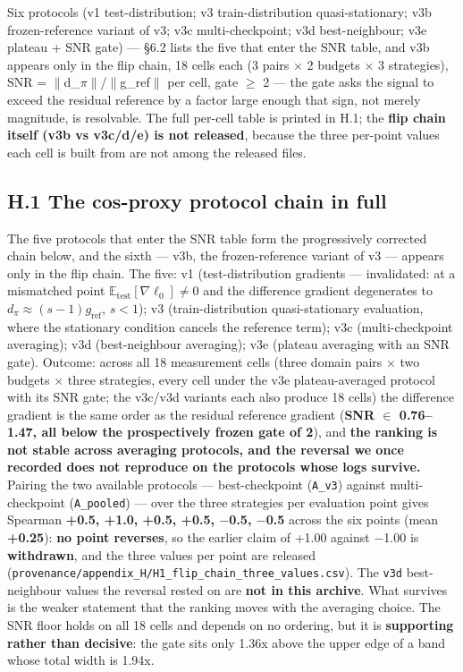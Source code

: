 \documentclass[pdflatex,sn-mathphys-ay]{sn-jnl}
\begin{document}
Six protocols (v1 test-distribution; v3 train-distribution quasi-stationary; v3b frozen-reference variant of v3; v3c multi-checkpoint; v3d best-neighbour; v3e plateau + SNR gate) --- \S{}6.2 lists the five that enter the SNR table, and v3b appears only in the flip chain, 18 cells each (3 pairs \ensuremath{\times} 2 budgets \ensuremath{\times} 3 strategies), SNR = \ensuremath{\|}d\_\ensuremath{\pi}\ensuremath{\|}/\ensuremath{\|}g\_ref\ensuremath{\|} per cell, gate \ensuremath{\geq} 2 --- the gate asks the signal to exceed the residual reference by a factor large enough that sign, not merely magnitude, is resolvable. The full per-cell table is printed in H.1; the \textbf{flip chain itself (v3b vs v3c/d/e) is not released}, because the three per-point values each cell is built from are not among the released files.

\subsection*{H.1 The cos-proxy protocol chain in full}

The five protocols that enter the SNR table form the progressively corrected chain below, and the sixth --- v3b, the frozen-reference variant of v3 --- appears only in the flip chain. The five: v1 (test-distribution gradients --- invalidated: at a mismatched point $\mathbb{E}_{\text{test}}[\nabla\ell_0]\neq0$ and the difference gradient degenerates to $d_\pi \approx (s{-}1)g_{\mathrm{ref}}$, $s<1$); v3 (train-distribution quasi-stationary evaluation, where the stationary condition cancels the reference term); v3c (multi-checkpoint averaging); v3d (best-neighbour averaging); v3e (plateau averaging with an SNR gate). Outcome: across all 18 measurement cells (three domain pairs \ensuremath{\times} two budgets \ensuremath{\times} three strategies, every cell under the v3e plateau-averaged protocol with its SNR gate; the v3c/v3d variants each also produce 18 cells) the difference gradient is the same order as the residual reference gradient (\textbf{SNR \ensuremath{\in} 0.76--1.47, all below the prospectively frozen gate of 2}), and \textbf{the ranking is not stable across averaging protocols, and the reversal we once recorded does not reproduce on the protocols whose logs survive.} Pairing the two available protocols --- best-checkpoint (\texttt{A\_v3}) against multi-checkpoint (\texttt{A\_pooled}) --- over the three strategies per evaluation point gives Spearman \textbf{+0.5, +1.0, +0.5, +0.5, \ensuremath{-}0.5, \ensuremath{-}0.5} across the six points (mean \textbf{+0.25}): \textbf{no point reverses}, so the earlier claim of +1.00 against \ensuremath{-}1.00 is \textbf{withdrawn}, and the three values per point are released (\texttt{provenance/appendix\_H/H1\_flip\_chain\_three\_values.csv}). The \texttt{v3d} best-neighbour values the reversal rested on are \textbf{not in this archive}. What survives is the weaker statement that the ranking moves with the averaging choice. The SNR floor holds on all 18 cells and depends on no ordering, but it is \textbf{supporting rather than decisive}: the gate sits only 1.36x above the upper edge of a band whose total width is 1.94x.
\end{document}
